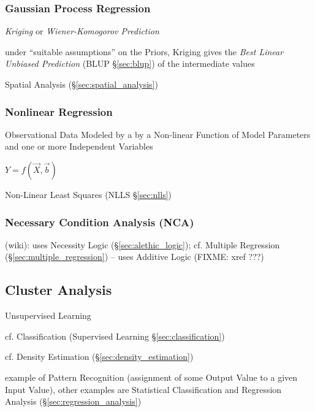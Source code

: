 \subsubsection{Gaussian Process Regression}
\label{sec:gaussian_process_regression}

\emph{Kriging} or \emph{Wiener-Komogorov Prediction}

under ``suitable assumptions'' on the Priors, Kriging gives the \emph{Best
  Linear Unbiased Prediction} (BLUP \S\ref{sec:blup}) of the intermediate values

\fist Spatial Analysis (\S\ref{sec:spatial_analysis})



\subsubsection{Nonlinear Regression}\label{sec:nonlinear_regression}

Observational Data Modeled by a by a Non-linear Function of Model Parameters and
one or more Independent Variables

$Y = f(\vec{X}, \vec{b})$

Non-Linear Least Squares (NLLS \S\ref{sec:nlls})



\subsubsection{Necessary Condition Analysis (NCA)}\label{sec:nca}

(wiki): uses Necessity Logic (\S\ref{sec:alethic_logic});
cf. Multiple Regression (\S\ref{sec:multiple_regression}) -- uses Additive Logic
(FIXME: xref ???)



\subsection{Cluster Analysis}\label{sec:cluster_analysis}

Unsupervised Learning

cf. Classification (Supervised Learning \S\ref{sec:classification})

cf. Density Estimation (\S\ref{sec:density_estimation})

example of Pattern Recognition (assignment of some Output Value to a given Input
Value), other examples are Statistical Classification and Regression Analysis
(\S\ref{sec:regression_analysis})

